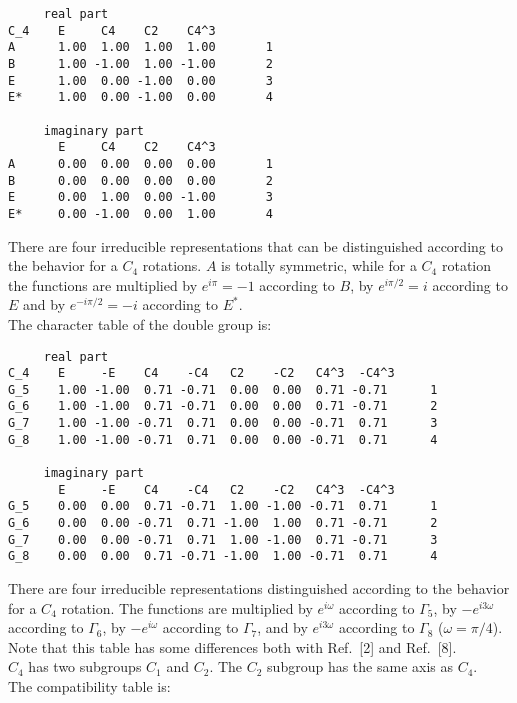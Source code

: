 \documentclass[12pt,a4paper,twoside]{report}
\begin{document}
\begin{tcolorbox}
\begin{footnotesize}
\begin{verbatim}
     real part
C_4    E     C4    C2    C4^3
A      1.00  1.00  1.00  1.00       1
B      1.00 -1.00  1.00 -1.00       2
E      1.00  0.00 -1.00  0.00       3
E*     1.00  0.00 -1.00  0.00       4

     imaginary part
       E     C4    C2    C4^3
A      0.00  0.00  0.00  0.00       1
B      0.00  0.00  0.00  0.00       2
E      0.00  1.00  0.00 -1.00       3
E*     0.00 -1.00  0.00  1.00       4
\end{verbatim}
\end{footnotesize}
\end{tcolorbox}

There are four irreducible representations that can be distinguished according
to the behavior for a $C_4$ rotations. $A$ is totally symmetric, while for a
$C_4$ rotation the functions are multiplied by $e^{i\pi}=-1$ according to 
$B$, by $e^{i\pi/2}=i$ according to $E$ and by $e^{-i\pi/2}=-i$ according to
$E^*$. \\
The character table of the double group is:

\begin{tcolorbox}
\begin{footnotesize}
\begin{verbatim}
     real part
C_4    E     -E    C4    -C4   C2    -C2   C4^3  -C4^3
G_5    1.00 -1.00  0.71 -0.71  0.00  0.00  0.71 -0.71      1
G_6    1.00 -1.00  0.71 -0.71  0.00  0.00  0.71 -0.71      2
G_7    1.00 -1.00 -0.71  0.71  0.00  0.00 -0.71  0.71      3
G_8    1.00 -1.00 -0.71  0.71  0.00  0.00 -0.71  0.71      4

     imaginary part
       E     -E    C4    -C4   C2    -C2   C4^3  -C4^3
G_5    0.00  0.00  0.71 -0.71  1.00 -1.00 -0.71  0.71      1
G_6    0.00  0.00 -0.71  0.71 -1.00  1.00  0.71 -0.71      2
G_7    0.00  0.00 -0.71  0.71  1.00 -1.00  0.71 -0.71      3
G_8    0.00  0.00  0.71 -0.71 -1.00  1.00 -0.71  0.71      4
\end{verbatim}
\end{footnotesize}
\end{tcolorbox}

There are four irreducible representations distinguished according
to the behavior for a $C_4$ rotation. The functions are multiplied by 
$e^{i\omega}$ according to $\Gamma_5$, by $-e^{i3\omega}$ according to 
$\Gamma_6$, by $-e^{i\omega}$ according to $\Gamma_7$, and by $e^{i3\omega}$ 
according to $\Gamma_8$ ($\omega=\pi/4$). Note that this table has some
differences both with Ref.~[2] and Ref.~[8].\\
$C_4$ has two subgroups $C_1$ and $C_2$. The $C_2$ subgroup has the same axis
as $C_4$. \\
The compatibility table is:
\end{document}
